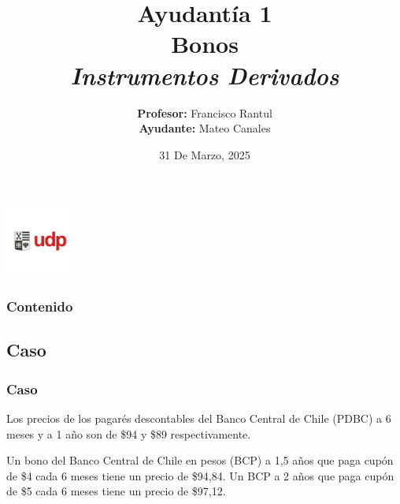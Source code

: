 \documentclass{beamer}
\title{Ayudantía 1 \\ Bonos \\ \large\textit{Instrumentos Derivados}}
\author{
  \texorpdfstring{
    \textbf{Profesor:} Francisco Rantul \\[0.3em]
    \textbf{Ayudante:} Mateo Canales
  }{Profesor: Francisco Rantul, Ayudante: Mateo Canales}
}
\institute{Universidad Diego Portales}
\date{31 De Marzo, 2025}
\begin{document}
\begin{frame}
    \titlepage
    \vfill
    \centering
    \includegraphics[width=2.3118cm]{../imagenes/logo.png}
  \end{frame}
  \begin{frame}
    \frametitle{Contenido}
    \tableofcontents
  \end{frame}
  \begin{frame}
\section{Caso}
  \frametitle{Caso}

  Los precios de los pagarés descontables del Banco Central de Chile (PDBC)
  a 6 meses y a 1 año son de \$94 y \$89 respectivamente. 
  
  Un bono del Banco Central de Chile en pesos (BCP) a 1,5 años que paga cupón de 
  \$4 cada 6 meses tiene un precio de \$94{,}84. Un BCP a 2 años que paga
  cupón de \$5 cada 6 meses tiene un precio de \$97{,}12.

\end{frame}
\end{document}
